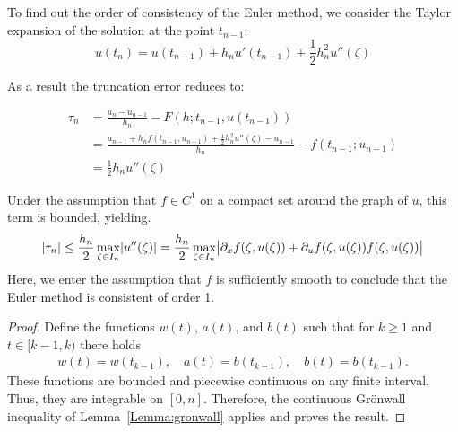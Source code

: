 \begin{example}
  To find out the order of consistency of the Euler method, we 
  consider the Taylor expansion of the solution at the point $t_{n-1}$:
  \begin{equation*}
    u(t_n) = u(t_{n-1}) + h_n u'(t_{n-1}) + \frac12 h_n^2 u''(\zeta)
  \end{equation*}
  
  As a result the truncation error reduces to:
  
  \begin{equation*}\begin{split}
    \tau_n & = \frac{u_n - u_{n-1}}{h_n} - F(h;t_{n-1},u(t_{n-1})) \\
    & = \frac{u_{n-1} + h_n f(t_{n-1},u_{n-1})
      + \frac12 h_n^2 u''(\zeta) - u_{n-1}}{h_n} - f(t_{n-1}; u_{n-1}) \\
    & = \frac12 h_n u''(\zeta)
  \end{split}\end{equation*}


Under the assumption that $f \in C^1$ on a compact set around the graph
of $u$, this term is bounded, yielding.
\begin{gather*}
  | \tau_n | \le \frac{h_n}{2} \max_{\zeta\in I_n} \lvert u''(\zeta)\rvert
  = \frac{h_n}{2} \max_{\zeta\in I_n} \bigl|\partial_x f(\zeta,
    u(\zeta)) + \partial_u  f(\zeta, u(\zeta)) f(\zeta, u(\zeta))\bigr|
\end{gather*}
Here, we enter the assumption that $f$ is sufficiently smooth to
conclude that the Euler method is consistent of order 1.
\end{example}



\begin{proof}
  Define the functions $w(t)$, $a(t)$, and $b(t)$ such that for $k\ge
  1$ and $t\in [k-1,k)$ there holds
  \begin{gather*}
    w(t) = w(t_{k-1}),\quad
    a(t) = b(t_{k-1}),\quad
    b(t) = b(t_{k-1}).
  \end{gather*}
  These functions are bounded and piecewise continuous on any finite
  interval. Thus, they are integrable on $[0,n]$. Therefore, the
  continuous Grönwall inequality of Lemma~\ref{Lemma:gronwall} applies
  and proves the result.
\end{proof}

